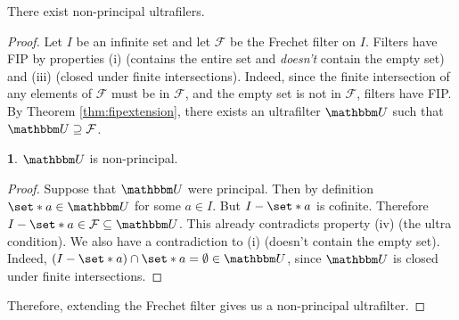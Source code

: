 \documentclass[11pt]{article}
\numberwithin{equation}{section}
\newcounter{theo}[section]\setcounter{theo}{0}
\theoremstyle{definition}
\newtheorem{claim}{\color{ForestGreen}{\textbf{Claim}}}[section]
\theoremstyle{definition}
\def\Set{\set*}%
\def\sse{\subseteq}
\newcommand{\1}{\mathbbm 1}
\newcommand{\UU}{\mathbbm U}
\newcommand{\fF}{\mathcal F}
\begin{document}
\begin{corollary}
	There exist non-principal ultrafilers. 
\end{corollary}
\begin{proof}
	Let $I$ be an infinite set and let $\fF$ be the Frechet filter on $I$. Filters have FIP by properties (i) (contains the entire set and \emph{doesn't} contain the empty set) and (iii) (closed under finite intersections). Indeed, since the finite intersection of any elements of $\fF$ must be in $\fF$, and the empty set is not in $\fF$, filters have FIP. By Theorem \ref{thm:fipextension}, there exists an ultrafilter $\UU$ such that $\UU \supseteq \fF$. 

	\begin{claim}
		$\UU$ is non-principal. 
	\end{claim}
	\begin{proof}
		Suppose that $\UU$ were principal. Then by definition $\Set{a} \in \UU$ for some $a \in I$. But $I - \Set{a}$ is cofinite. Therefore $I - \Set{a} \in \fF \sse \UU$. This already contradicts property (iv) (the ultra condition). We also have a contradiction to (i) (doesn't contain the empty set). Indeed, $(I - \Set{a}) \cap \Set{a} = \emptyset \in \UU$, since $\UU$ is closed under finite intersections. 
	\end{proof}
	
	Therefore, extending the Frechet filter gives us a non-principal ultrafilter. 
\end{proof}
\end{document}
